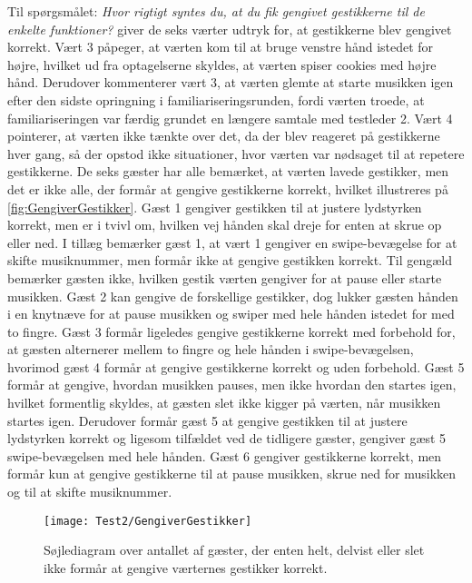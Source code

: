 Til spørgsmålet: \textit{Hvor rigtigt syntes du, at du fik gengivet gestikkerne til de enkelte funktioner?} giver de seks værter udtryk for, at gestikkerne blev gengivet korrekt. Vært 3 påpeger, at værten kom til at bruge venstre hånd istedet for højre, hvilket ud fra optagelserne skyldes, at værten spiser cookies med højre hånd. Derudover kommenterer vært 3, at værten glemte at starte musikken igen efter den sidste opringning i familiariseringsrunden, fordi værten troede, at familiariseringen var færdig grundet en længere samtale med testleder 2. Vært 4 pointerer, at værten ikke tænkte over det, da der blev reageret på gestikkerne hver gang, så der opstod ikke situationer, hvor værten var nødsaget til at repetere gestikkerne. \blankline
%
De seks gæster har alle bemærket, at værten lavede gestikker, men det er ikke alle, der formår at gengive gestikkerne korrekt, hvilket illustreres på \autoref{fig:GengiverGestikker}. Gæst 1 gengiver gestikken til at justere lydstyrken korrekt, men er i tvivl om, hvilken vej hånden skal dreje for enten at skrue op eller ned. I tillæg bemærker gæst 1, at vært 1 gengiver en swipe-bevægelse for at skifte musiknummer, men formår ikke at gengive gestikken korrekt. Til gengæld bemærker gæsten ikke, hvilken gestik værten gengiver for at pause eller starte musikken. Gæst 2 kan gengive de forskellige gestikker, dog lukker gæsten hånden i en knytnæve for at pause musikken og swiper med hele hånden istedet for med to fingre. Gæst 3 formår ligeledes gengive gestikkerne korrekt med forbehold for, at gæsten alternerer mellem to fingre og hele hånden i swipe-bevægelsen, hvorimod gæst 4 formår at gengive gestikkerne korrekt og uden forbehold. Gæst 5 formår at gengive, hvordan musikken pauses, men ikke hvordan den startes igen, hvilket formentlig skyldes, at gæsten slet ikke kigger på værten, når musikken startes igen. Derudover formår gæst 5 at gengive gestikken til at justere lydstyrken korrekt og ligesom tilfældet ved de tidligere gæster, gengiver gæst 5 swipe-bevægelsen med hele hånden. Gæst 6 gengiver gestikkerne korrekt, men formår kun at gengive gestikkerne til at pause musikken, skrue ned for musikken og til at skifte musiknummer. 
%
\begin{figure}[H]
	\centering
	\texttt{[image: Test2/GengiverGestikker]}
	\caption{Søjlediagram over antallet af gæster, der enten helt, delvist eller slet ikke formår at gengive værternes gestikker korrekt.}
	\label{fig:GengiverGestikker}
\end{figure}
\noindent
%
